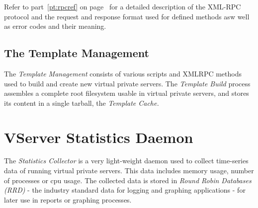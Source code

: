 Refer to part~\ref{pt:rpcref} on page~\pageref{pt:rpcref} for a detailed
description of the XML-RPC protocol and the request and response format used
for defined methods asw well as error codes and their meaning.


\subsection{The Template Management}

The \emph{Template Management} consists of various scripts and XMLRPC methods
used to build and create new virtual private servers. The \emph{Template Build}
process assembles a complete root filesystem usable in virtual private servers,
and stores its content in a single tarball, the \emph{Template Cache.}


\section{VServer Statistics Daemon}
\label{sec:intro:vcd:vstatd}

The \emph{Statistics Collector} is a very light-weight daemon used to collect
time-series data of running virtual private servers. This data includes memory
usage, number of processes or cpu usage. The collected data is stored in
\emph{Round Robin Databases (RRD)} - the industry standard data for logging and
graphing applications - for later use in reports or graphing processes.
